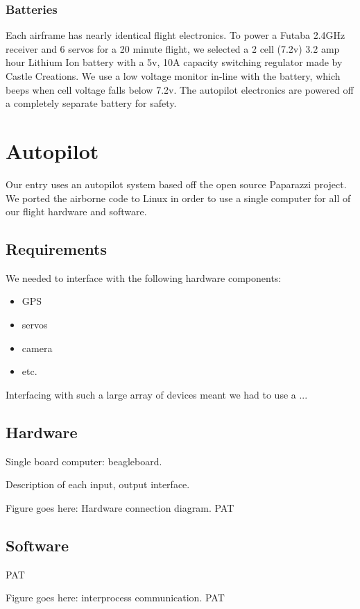 \documentclass[10pt]{report}
\begin{document}
\subsubsection{Batteries}

Each airframe has nearly identical flight electronics. To power a Futaba 2.4GHz receiver and 6 servos for a 20 minute flight, we selected a 2 cell (7.2v) 3.2 amp hour Lithium Ion battery with a 5v, 10A capacity switching regulator made by Castle Creations. We use a low voltage monitor in-line with the battery, which beeps when cell voltage falls below 7.2v. The autopilot electronics are powered off a completely separate battery for safety.

\section{Autopilot}
Our entry uses an autopilot system based off the open source 
Paparazzi project\cite{paparazziweb}. 
We ported the airborne code to Linux in order to use a single computer for all of our flight hardware and software.

\subsection{Requirements}

We needed to interface with the following hardware components:
\begin{itemize}
	\setlength{\itemsep}{0cm}
	\setlength{\parskip}{0cm}
	\item GPS
	\item servos
	\item camera
	\item etc.
\end{itemize}

Interfacing with such a large array of devices meant we had to use a ...

\subsection{Hardware}
Single board computer: beagleboard.

Description of each input, output interface.

Figure goes here: Hardware connection diagram. PAT
\subsection{Software}
PAT

Figure goes here: interprocess communication. PAT
\end{document}
